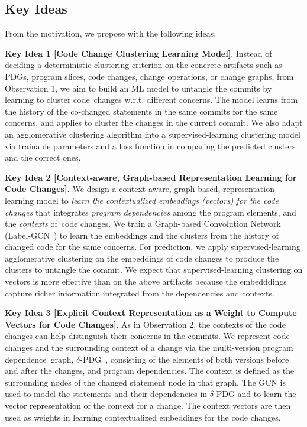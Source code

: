 \subsection{Key Ideas}
\label{ideas:sec}

From the motivation, we propose {\tool} with the following
ideas.


{\bf Key Idea 1 [Code Change Clustering Learning Model]}. Instead of
deciding a deterministic clustering criterion on the concrete
artifacts such as PDGs, program slices, code changes, change
operations, or change graphs, from Observation 1, we aim to build an
ML model to untangle the commits by learning to cluster code~changes
w.r.t. different concerns. The model learns from the history of the
co-changed statements in the same commits for the same concerns, and
applies to cluster the changes in the current commit.  We also adapt
an agglomerative clustering algorithm into a supervised-learning
clustering model via trainable parameters and a loss function in
comparing the predicted clusters and the correct ones.

{\bf Key Idea 2 [Context-aware, Graph-based Representation Learning
    for Code Changes].} We design a context-aware, graph-based,
representation learning model to {\em learn the contextualized
  embeddings (vectors) for the code changes} that integrates {\em
  program dependencies} among the program elements, and the {\em
  contexts} of~code changes. We train a Graph-based Convolution
Network (Label-GCN~\cite{yi}) to learn the embeddings and the
clusters from the history of changed code for the same concerns.
For prediction, we apply supervised-learning agglomerative
clustering on the embeddings of code changes to produce the clusters
to untangle the commit. We expect that supervised-learning clustering
on vectors is more effective than on the above artifacts because the
embedddings capture richer information integrated from the
dependencies and contexts.


{\bf Key Idea 3 [Explicit Context Representation as a Weight to
    Compute Vectors for Code Changes]}. As in Observation 2, the
contexts of the code changes can help distinguish their concerns in
the commits. We represent code changes and the surrounding context of
a change via the multi-version program dependence~graph,
$\delta$-PDG~\cite{flexeme-fse20}, consisting of the elements of both
versions before and after the changes, and program dependencies. The
context is defined as the surrounding nodes of the changed statement
node in that graph. The GCN is used to model the statements and their
dependencies in $\delta$-PDG and to learn the vector
representation of the context for a change. The context vectors are
then used as weights in learning contextualized embeddings for the
code changes.

